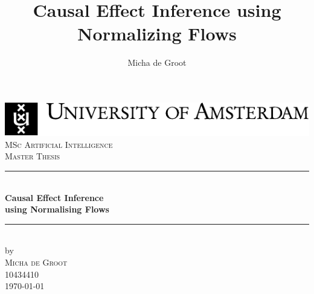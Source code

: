 \documentclass{article}
\title{Causal Effect Inference using Normalizing Flows}
\author{Micha de Groot}
\newcommand{\red}[1]{{\color{red}{#1}}}
\begin{document}
\begin{titlepage}

\newcommand{\HRule}{\rule{\linewidth}{0.5mm}} %
\center %
 

\includegraphics[width=\linewidth]{uvaENG}\\[2.5cm]
\textsc{\Large MSc Artificial Intelligence}\\[0.2cm]
\textsc{\Large Master Thesis}\\[0.5cm] 


\HRule \\[0.4cm]
{ \huge \bfseries Causal Effect Inference\\ using Normalising Flows}\\[0.4cm] %
\HRule \\[0.5cm]
 

by\\[0.2cm]
\textsc{\Large Micha de Groot}\\[0.2cm] %
10434410\\[1cm]



{\Large \today}\\[1cm] %


\end{titlepage}
\end{document}
